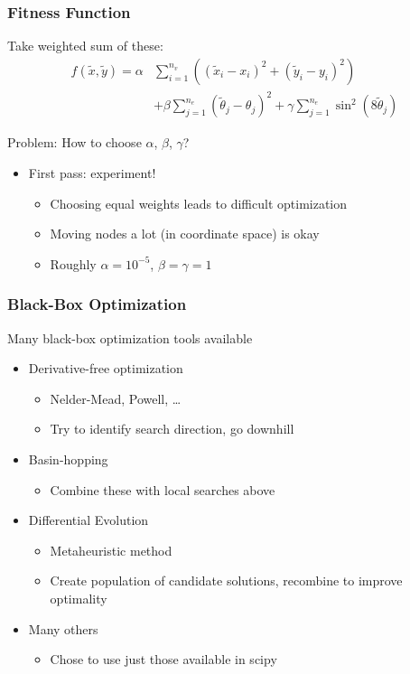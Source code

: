\documentclass[12pt,t,xcolor=dvipsnames]{beamer}
\begin{document}
\begin{frame}
\frametitle{Fitness Function}

Take weighted sum of these:
\begin{align*}
f(\tilde{x},\tilde{y}) = \alpha&\sum_{i=1}^{n_v}
\left((\tilde{x}_i-x_i)^2+(\tilde{y}_i - y_i)^2\right)\\
& + \beta\sum_{j=1}^{n_e} \left(\tilde{\theta}_j - \theta_j\right)^2
+\gamma\sum_{j=1}^{n_e}\sin^2\left(8\tilde{\theta}_j\right)
\end{align*}

Problem: How to choose $\alpha$, $\beta$, $\gamma$?
\begin{itemize}
\item First pass: experiment!
  \begin{itemize}
  \item Choosing equal weights leads to difficult optimization
  \item Moving nodes a lot (in coordinate space) is okay
  \item Roughly $\alpha = 10^{-5}$, $\beta = \gamma = 1$
  \end{itemize}
\end{itemize}

\end{frame}

\begin{frame}
  \frametitle{Black-Box Optimization}

  Many black-box optimization tools available
  \begin{itemize}
  \item Derivative-free optimization
    \begin{itemize}
    \item Nelder-Mead, Powell, \ldots
    \item Try to identify search direction, go downhill
    \end{itemize}
  \item Basin-hopping
    \begin{itemize}
    \item Combine these with local searches above
    \end{itemize}
  \item Differential Evolution
    \begin{itemize}
    \item Metaheuristic method
    \item Create population of candidate solutions, recombine to
      improve optimality
    \end{itemize}
  \item Many others
    \begin{itemize}
      \item Chose to use just those available in scipy
    \end{itemize}
  \end{itemize}

\end{frame}
\end{document}
